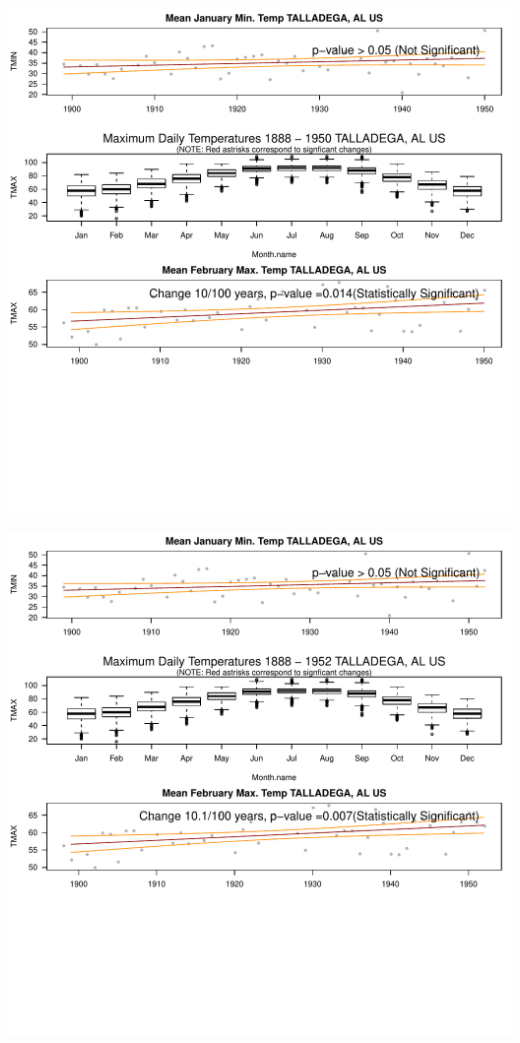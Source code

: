 \documentclass{article}\usepackage[]{graphicx}\usepackage[]{color}
\makeatletter
\def\maxwidth{ %
  \ifdim\Gin@nat@width>\linewidth
    \linewidth
  \else
    \Gin@nat@width
  \fi
}
\newenvironment{knitrout}{}{} %
\makeatother
\begin{document}
\begin{knitrout}
\includegraphics[width=\maxwidth]{figure/static_template-21} 

\includegraphics[width=\maxwidth]{figure/static_template-22} 


\end{knitrout}
\end{document}
